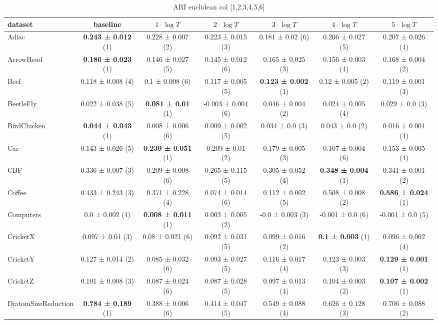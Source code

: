 \begin{table}[ht]
\caption{ARI euclidean col [1,2,3,4,5,6]} 
\begin{adjustbox}{width=\textwidth}
\begin{tabular}{lcccccc}
\hline
dataset & baseline & \textbf{$1\cdot \log{T}$} & \textbf{$2\cdot \log{T}$} & \textbf{$3\cdot \log{T}$} & \textbf{$4\cdot \log{T}$} & \textbf{$5\cdot \log{T}$} \\ \hline
Adiac & \textbf{0.243 ± 0.012} (1) & 0.228 ± 0.007 (2) & 0.223 ± 0.015 (3) & 0.181 ± 0.02 (6) & 0.206 ± 0.027 (5) & 0.207 ± 0.026 (4) \\
ArrowHead & \textbf{0.186 ± 0.023} (1) & 0.146 ± 0.027 (5) & 0.145 ± 0.012 (6) & 0.165 ± 0.025 (3) & 0.156 ± 0.003 (4) & 0.168 ± 0.004 (2) \\
Beef & 0.118 ± 0.008 (4) & 0.1 ± 0.008 (6) & 0.117 ± 0.005 (5) & \textbf{0.123 ± 0.002} (1) & 0.12 ± 0.005 (2) & 0.119 ± 0.001 (3) \\
BeetleFly & 0.022 ± 0.038 (5) & \textbf{0.081 ± 0.01} (1) & -0.003 ± 0.004 (6) & 0.046 ± 0.004 (2) & 0.024 ± 0.005 (4) & 0.029 ± 0.0 (3) \\
BirdChicken & \textbf{0.044 ± 0.043} (1) & 0.008 ± 0.006 (6) & 0.009 ± 0.002 (5) & 0.034 ± 0.0 (3) & 0.043 ± 0.0 (2) & 0.016 ± 0.001 (4) \\
Car & 0.143 ± 0.026 (5) & \textbf{0.239 ± 0.051} (1) & 0.209 ± 0.01 (2) & 0.179 ± 0.005 (3) & 0.107 ± 0.004 (6) & 0.153 ± 0.005 (4) \\
CBF & 0.336 ± 0.007 (3) & 0.209 ± 0.008 (6) & 0.265 ± 0.115 (5) & 0.305 ± 0.052 (4) & \textbf{0.348 ± 0.004} (1) & 0.341 ± 0.001 (2) \\
Coffee & 0.433 ± 0.243 (3) & 0.371 ± 0.228 (4) & 0.074 ± 0.014 (6) & 0.112 ± 0.002 (5) & 0.508 ± 0.008 (2) & \textbf{0.586 ± 0.024} (1) \\
Computers & 0.0 ± 0.002 (4) & \textbf{0.008 ± 0.011} (1) & 0.003 ± 0.005 (2) & -0.0 ± 0.003 (3) & -0.001 ± 0.0 (6) & -0.001 ± 0.0 (5) \\
CricketX & 0.097 ± 0.01 (3) & 0.08 ± 0.021 (6) & 0.092 ± 0.031 (5) & 0.099 ± 0.016 (2) & \textbf{0.1 ± 0.003} (1) & 0.096 ± 0.002 (4) \\
CricketY & 0.127 ± 0.014 (2) & 0.085 ± 0.032 (6) & 0.093 ± 0.027 (5) & 0.116 ± 0.017 (4) & 0.123 ± 0.003 (3) & \textbf{0.129 ± 0.001} (1) \\
CricketZ & 0.101 ± 0.008 (3) & 0.087 ± 0.024 (6) & 0.087 ± 0.028 (5) & 0.097 ± 0.013 (4) & 0.104 ± 0.003 (2) & \textbf{0.107 ± 0.002} (1) \\
DiatomSizeReduction & \textbf{0.784 ± 0.189} (1) & 0.388 ± 0.006 (6) & 0.414 ± 0.047 (5) & 0.549 ± 0.088 (4) & 0.626 ± 0.128 (3) & 0.706 ± 0.088 (2) \\

\end{tabular}
\end{adjustbox}
\end{table}
